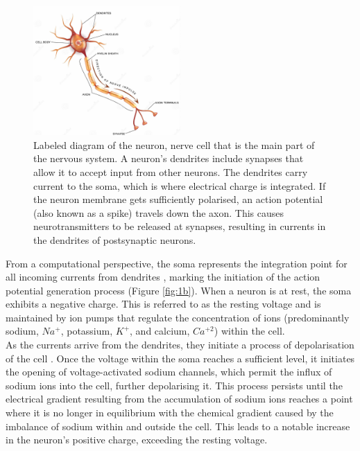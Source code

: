 \begin{figure}[htbp!] 
    \centering    
    \includegraphics[width=0.5\textwidth]{Chapter1/Figs/1a.png}
    \caption[Labeled diagram of the neuron.]{Labeled diagram of the neuron, nerve cell that is the main part of the nervous system. A neuron's dendrites include synapses that allow it to accept input from other neurons. The dendrites carry current to the soma, which is where electrical charge is integrated. If the neuron membrane gets sufficiently polarised, an action potential (also known as a spike) travels down the axon. This causes neurotransmitters to be released at synapses, resulting in currents in the dendrites of postsynaptic neurons.}
    \label{fig:1a}
    \end{figure}

\noindent From a computational perspective, the soma represents the integration point for all incoming currents from dendrites \cite{polsky2004computational}, marking the initiation of the action potential generation process (Figure \ref{fig:1b}). When a neuron is at rest, the soma exhibits a negative charge. This is referred to as the resting voltage and is maintained by ion pumps that regulate the concentration of ions (predominantly sodium, $Na^+$, potassium, $K^+$, and calcium, $Ca^{+2}$) within the cell. \\


\noindent As the currents arrive from the dendrites, they initiate a process of depolarisation of the cell \cite{johnston1996active}. Once the voltage within the soma reaches a sufficient level, it initiates the opening of voltage-activated sodium channels, which permit the influx of sodium ions into the cell, further depolarising it. This process persists until the electrical gradient resulting from the accumulation of sodium ions reaches a point where it is no longer in equilibrium with the chemical gradient caused by the imbalance of sodium within and outside the cell. This leads to a notable increase in the neuron's positive charge, exceeding the resting voltage. \\

